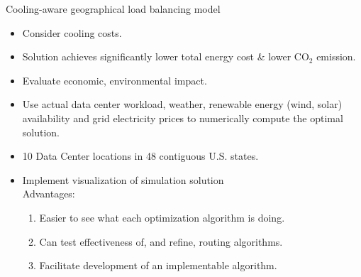 \documentclass[xcolor=dvipsnames]{beamer}
\newcommand{\carbondioxide}{\ensuremath{\mathrm{CO}_2}}
\begin{document}
\begin{frame}{Cooling-aware geographical load balancing model}

		\begin{itemize}
			\item{Consider cooling costs.} 
			\item{Solution achieves significantly lower total energy cost \& lower \carbondioxide{} emission.}
			\item{Evaluate economic, environmental impact.}
			\item{Use actual data center workload, weather, renewable energy (wind, solar) availability and grid electricity prices to numerically compute the optimal solution.}
			\item{10 Data Center locations in 48 contiguous U.S. states.} 
			\item{Implement visualization of simulation solution \\
				Advantages: 
				\begin{enumerate}
					\item{Easier to see what each optimization algorithm is doing.}
					\item{Can test effectiveness of, and refine, routing algorithms.} 
					\item{Facilitate development of an implementable algorithm.}
				\end{enumerate}
				}			
		\end{itemize}
\end{frame}
\end{document}
